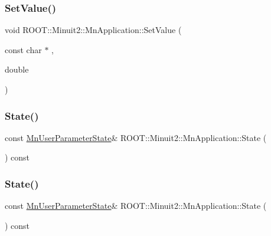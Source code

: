 \subsubsection{\texorpdfstring{SetValue()}{SetValue()}\hspace{0.1cm}{\footnotesize\ttfamily [6/6]}}
{\footnotesize\ttfamily void R\+O\+O\+T\+::\+Minuit2\+::\+Mn\+Application\+::\+Set\+Value (\begin{DoxyParamCaption}\item[{const char $\ast$}]{,  }\item[{double}]{ }\end{DoxyParamCaption})}

\mbox{\label{classROOT_1_1Minuit2_1_1MnApplication_ac82c0ac40ced7cf8904dc702a79512f7}} 
\subsubsection{\texorpdfstring{State()}{State()}\hspace{0.1cm}{\footnotesize\ttfamily [1/3]}}
{\footnotesize\ttfamily const \mbox{\hyperlink{classROOT_1_1Minuit2_1_1MnUserParameterState}{Mn\+User\+Parameter\+State}}\& R\+O\+O\+T\+::\+Minuit2\+::\+Mn\+Application\+::\+State (\begin{DoxyParamCaption}{ }\end{DoxyParamCaption}) const\hspace{0.3cm}{\ttfamily [inline]}}

\mbox{\label{classROOT_1_1Minuit2_1_1MnApplication_ac82c0ac40ced7cf8904dc702a79512f7}} 
\subsubsection{\texorpdfstring{State()}{State()}\hspace{0.1cm}{\footnotesize\ttfamily [2/3]}}
{\footnotesize\ttfamily const \mbox{\hyperlink{classROOT_1_1Minuit2_1_1MnUserParameterState}{Mn\+User\+Parameter\+State}}\& R\+O\+O\+T\+::\+Minuit2\+::\+Mn\+Application\+::\+State (\begin{DoxyParamCaption}{ }\end{DoxyParamCaption}) const\hspace{0.3cm}{\ttfamily [inline]}}

